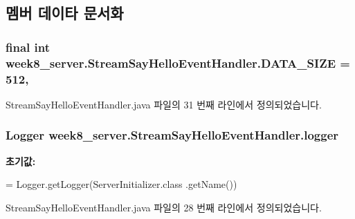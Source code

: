 \subsection{멤버 데이타 문서화}
\hypertarget{classweek8__server_1_1_stream_say_hello_event_handler_aaaadade47c5c1093fa1b82e876039036}{
\subsubsection[{D\-A\-T\-A\-\_\-\-S\-I\-Z\-E}]{\setlength{\rightskip}{0pt plus 5cm}final int week8\-\_\-server.\-Stream\-Say\-Hello\-Event\-Handler.\-D\-A\-T\-A\-\_\-\-S\-I\-Z\-E = 512\hspace{0.3cm}{\ttfamily [static]}, {\ttfamily [private]}}}\label{classweek8__server_1_1_stream_say_hello_event_handler_aaaadade47c5c1093fa1b82e876039036}


Stream\-Say\-Hello\-Event\-Handler.\-java 파일의 31 번째 라인에서 정의되었습니다.

\hypertarget{classweek8__server_1_1_stream_say_hello_event_handler_a68c45171ab9184973fa32d5b18f1fc70}{
\subsubsection[{logger}]{\setlength{\rightskip}{0pt plus 5cm}Logger week8\-\_\-server.\-Stream\-Say\-Hello\-Event\-Handler.\-logger\hspace{0.3cm}{\ttfamily [static]}}}\label{classweek8__server_1_1_stream_say_hello_event_handler_a68c45171ab9184973fa32d5b18f1fc70}
{\bfseries 초기값\-:}
\begin{DoxyCode}
= Logger.getLogger(ServerInitializer.class
            .getName())
\end{DoxyCode}


Stream\-Say\-Hello\-Event\-Handler.\-java 파일의 28 번째 라인에서 정의되었습니다.

